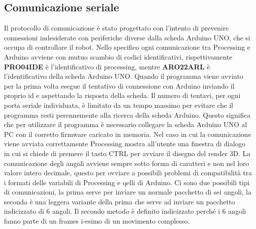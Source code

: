 \documentclass[a4paper]{article}
\begin{document}
    \subsection{Comunicazione seriale}
    
    \begin{text}
        Il protocollo di comunicazione è stato progettato con l'intento di prevenire connessioni indesiderate con periferiche diverse dalla scheda Arduino UNO, che si occupa di controllare il robot. Nello specifico ogni comunicazione tra Processing e Arduino avviene con mutuo scambio di codici identificativi, rispettivamente \textbf{PRO04IDE} è l'identificativo di processing, mentre \textbf{ARO22ARL} è l'identificativo della scheda Arduino UNO. Quando il programma viene avviato per la prima volta esegue il tentativo di connessione con Arduino inviando il proprio id e aspettando la risposta della scheda. Il numero di tentavi, per ogni porta seriale individuata, è limitato da un tempo massimo per evitare che il programma resti perennemente alla ricerca della scheda Arduino. Questo significa che per utilizzare il programma è necessario collegare la scheda Arduino UNO al PC con il corretto firmware caricato in memoria. Nel caso in cui la comunicazione viene avviata correttamente Processing mostra all'utente una finestra di dialogo in cui si chiede di premere il tasto CTRL per avviare il disegno del render 3D. La comunicazione degli angoli avviene sempre sotto forma di caratteri e non nel loro valore intero decimale, questo per ovviare a possibili problemi di compatibilità tra i formati delle variabili di Processing e qelli di Arduino. Ci sono due possibili tipi di comunicazioni, la prima serve per inviare un normale pacchetto di sei angoli, la seconda è una leggera variante della prima che serve ad inviare un pacchetto indicizzato di 6 angoli. Il secondo metodo è definito indicizzato perché i 6 angoli fanno parte di un frames i-esimo di un movimento complesso. \\ \\
    \end{text}
    
\end{document}
